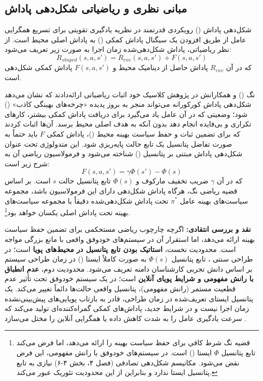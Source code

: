 \documentclass[oneside,openany,phd]{TMU-Thesis}
\begin{document}
\subsection{مبانی نظری و ریاضیاتی شکل‌دهی پاداش}
\label{sec:ch3_reward_shaping_math}

شکل‌دهی پاداش () رویکردی قدرتمند در نظریه یادگیری تقویتی برای تسریع همگرایی عامل از طریق افزودن یک سیگنال پاداش کمکی () به پاداش اصلی محیط است. از نظر ریاضیاتی، پاداش شکل‌دهی‌شده زمان اجرا به صورت زیر تعریف می‌شود:
\begin{equation}
    R_{shaped}(s, a, s') = R_{env}(s, a, s') + F(s, a, s')
\end{equation}
که در آن $R_{env}$ پاداش حاصل از دینامیک محیط و $F(s, a, s')$ پاداش کمکی شکل‌دهی است.

نگ () و همکارانش در پژوهش کلاسیک خود \cite{ng1999policy} اثبات ریاضیاتی ارائه‌دادند که نشان می‌دهد شکل‌دهی پاداش کورکورانه می‌تواند منجر به بروز پدیده «چرخه‌های بهینگی کاذب» () شود؛ وضعیتی که در آن عامل یاد می‌گیرد برای دریافت پاداش کمکی بیشتر، کارهای تکراری و بی‌فایده انجام دهد بدون آنکه به هدف اصلی محیط برسد. آن‌ها اثبات کردند که برای تضمین ثبات و حفظ سیاست بهینه محیط ()، پاداش کمکی $F$ باید حتماً به صورت تفاضل پتانسیل یک تابع حالت پایه‌ریزی شود. این متدولوژی تحت عنوان شکل‌دهی پاداش مبتنی بر پتانسیل () شناخته می‌شود \cite{ng1999policy} و فرمولاسیون ریاضی آن به شرح زیر است:
\begin{equation}
    F(s, a, s') = \gamma \Phi(s') - \Phi(s)
\end{equation}
که در آن $\gamma$ ضریب تخفیف مارکوف و $\Phi(s)$ تابع پتانسیل حالت $s$ است. بر اساس قضیه ریاضی نگ، هرگاه پاداش شکل‌دهی دارای این فرمولاسیون باشد، مجموعه سیاست‌های بهینه عامل $\pi^*$ تحت پاداش شکل‌دهی‌شده دقیقاً با مجموعه سیاست‌های بهینه تحت پاداش اصلی یکسان خواهد بود\footnote{قضیه نگ \cite{ng1999policy} شرط کافی برای حفظ سیاست بهینه را ارائه می‌دهد، اما فرض می‌کند تابع پتانسیل $\Phi$ ایستا () است. در سیستم‌های خودوفق با رانش مفهومی، این فرض نقض می‌شود. مکانیسم شکل‌دهی تصادفی  (فصل ۴، بخش ۴-۶) نیازی به تابع پتانسیل ایستا ندارد و بنابراین از این محدودیت تئوریک عبور می‌کند.}.

\textbf{نقد و بررسی انتقادی:}
اگرچه  چارچوب ریاضی مستحکمی برای تضمین حفظ سیاست بهینه ارائه می‌دهد، اما استقرار آن در سیستم‌های خودوفق واقعی با مانع بزرگی مواجه است.
محدودیت نخست، \textbf{استاتیک بودن تابع پتانسیل در محیط‌های پویا} است؛ در طراحی سنتی  \cite{ng1999policy}، تابع پتانسیل $\Phi(s)$ به صورت کاملاً ایستا () در زمان طراحی سیستم بر اساس دانش تجربی کارشناسان دامنه تعریف می‌شود.
محدودیت دوم، \textbf{عدم انطباق با رانش مفهومی و شرایط پویای آنلاین} است؛ در یک سیستم خودوفق تحت تأثیر عدم قطعیت مستمر (رانش مفهومی)، پتانسیل واقعی حالت‌ها دائماً تغییر می‌کند. یک پتانسیل ایستای تعریف‌شده در زمان طراحی، قادر به بازتاب پویایی‌های پیش‌بینی‌نشده زمان اجرا نیست و در شرایط جدید، پاداش‌های کمکی گمراه‌کننده‌ای تولید می‌کند که سرعت یادگیری عامل را به شدت کاهش داده یا همگرایی آنلاین را مختل می‌سازد \cite{gheibi2024dealing}.
\end{document}
